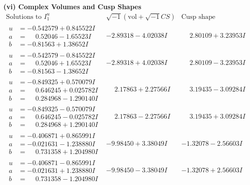 \documentclass[1p]{elsarticle_modified}
\theoremstyle{definition}
\newcommand{\I}{\sqrt{-1}}
\begin{document}
\newpage\flushleft \textbf{(vi) Complex Volumes and Cusp Shapes}
$$\begin{array}{c|c|c}  
\text{Solutions to }I^u_{1}& \I (\text{vol} + \sqrt{-1}CS) & \text{Cusp shape}\\
 \hline 
\begin{aligned}
u &= -0.542579 + 0.845522 I \\
a &= \phantom{-}0.52046 - 1.65523 I \\
b &= -0.81563 + 1.38652 I\end{aligned}
 & -2.89318 - 4.02038 I & \phantom{-}2.80109 + 3.23953 I \\ \hline\begin{aligned}
u &= -0.542579 - 0.845522 I \\
a &= \phantom{-}0.52046 + 1.65523 I \\
b &= -0.81563 - 1.38652 I\end{aligned}
 & -2.89318 + 4.02038 I & \phantom{-}2.80109 - 3.23953 I \\ \hline\begin{aligned}
u &= -0.849325 + 0.570079 I \\
a &= \phantom{-}0.646245 + 0.025782 I \\
b &= \phantom{-}0.284968 - 1.290140 I\end{aligned}
 & \phantom{-}2.17863 + 2.27566 I & \phantom{-}3.19435 - 3.09284 I \\ \hline\begin{aligned}
u &= -0.849325 - 0.570079 I \\
a &= \phantom{-}0.646245 - 0.025782 I \\
b &= \phantom{-}0.284968 + 1.290140 I\end{aligned}
 & \phantom{-}2.17863 - 2.27566 I & \phantom{-}3.19435 + 3.09284 I \\ \hline\begin{aligned}
u &= -0.406871 + 0.865991 I \\
a &= -0.021631 - 1.238880 I \\
b &= \phantom{-}0.731358 + 1.204980 I\end{aligned}
 & -9.98450 + 3.38049 I & -1.32078 - 2.56603 I \\ \hline\begin{aligned}
u &= -0.406871 - 0.865991 I \\
a &= -0.021631 + 1.238880 I \\
b &= \phantom{-}0.731358 - 1.204980 I\end{aligned}
 & -9.98450 - 3.38049 I & -1.32078 + 2.56603 I \\ \hline\begin{aligned}

\end{aligned}
\end{array}$$
\end{document}
